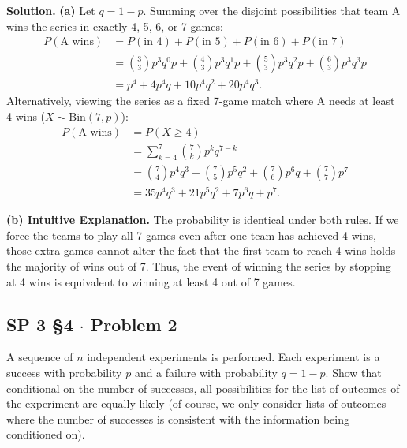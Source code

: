 \documentclass[11pt,a4paper]{article}
\begin{document}
\noindent \textbf{Solution.} \textbf{(a)} Let $q = 1 - p$. Summing over the disjoint possibilities that team A wins the series in exactly 4, 5, 6, or 7 games:
\begin{align*}
P(\text{A wins}) &= P(\text{in 4}) + P(\text{in 5}) + P(\text{in 6}) + P(\text{in 7}) \\
&= \binom{3}{3} p^3 q^0 p + \binom{4}{3} p^3 q^1 p + \binom{5}{3} p^3 q^2 p + \binom{6}{3} p^3 q^3 p \\
&= p^4 + 4 p^4 q + 10 p^4 q^2 + 20 p^4 q^3.
\end{align*}
Alternatively, viewing the series as a fixed 7-game match where A needs at least 4 wins ($X \sim \text{Bin}(7, p)$):
\begin{align*}
P(\text{A wins}) &= P(X \ge 4) \\
&= \sum_{k=4}^{7} \binom{7}{k} p^k q^{7-k} \\
&= \binom{7}{4} p^4 q^3 + \binom{7}{5} p^5 q^2 + \binom{7}{6} p^6 q + \binom{7}{7} p^7 \\
&= 35 p^4 q^3 + 21 p^5 q^2 + 7 p^6 q + p^7.
\end{align*}

\vspace{4pt}
\noindent \textbf{(b) Intuitive Explanation.} The probability is identical under both rules. If we force the teams to play all 7 games even after one team has achieved 4 wins, those extra games cannot alter the fact that the first team to reach 4 wins holds the majority of wins out of 7. Thus, the event of winning the series by stopping at 4 wins is equivalent to winning at least 4 out of 7 games.

\vspace{10pt}
\subsection{SP 3 \S4 $\cdot$ Problem 2}
\begin{tcolorbox}[title={SP 3 \S4 $\cdot$ Problem 2}]
A sequence of $n$ independent experiments is performed. Each experiment is a success with probability $p$ and a failure with probability $q = 1 - p$. Show that conditional on the number of successes, all possibilities for the list of outcomes of the experiment are equally likely (of course, we only consider lists of outcomes where the number of successes is consistent with the information being conditioned on).
\end{tcolorbox}
\end{document}
